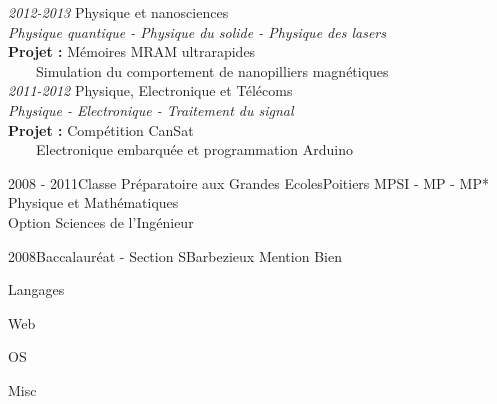 \documentclass[a4paper]{genard-cv}
\begin{document}
\begin{body}
\begin{entry}
			\textit{2012-2013} Physique et nanosciences\\
			\textit{Physique quantique - Physique du solide - Physique des lasers}\\
			\textbf{Projet :} Mémoires MRAM ultrarapides\\
			~~~~Simulation du comportement de nanopilliers magnétiques
			\medskip\\

			\textit{2011-2012} Physique, Electronique et Télécoms\\
			\textit{Physique - Electronique - Traitement du signal}\\
			\textbf{Projet :} Compétition CanSat\\
			~~~~Electronique embarquée et programmation Arduino
		\end{entry}
		\begin{entry}
			{2008 - 2011}{Classe Préparatoire aux Grandes Ecoles}{Poitiers}
			{MPSI - MP - MP*}
			Physique et Mathématiques\\
			Option Sciences de l'Ingénieur
		\end{entry}
		\begin{entry}
			{2008}{Baccalauréat - Section S}{Barbezieux}
			{Mention Bien}
		\end{entry}

\end{body}

\begin{aside}

	\begin{about}
	\end{about}\noindent

	\skills
	
	\begin{skillgroup}{Langages}
	\end{skillgroup}

	\begin{skillgroup}{Web}
	\end{skillgroup}

	\begin{skillgroup}{OS}
	\end{skillgroup}

	\begin{skillgroup}{Misc}
	\end{skillgroup}

	\skillscaption
\end{aside}
\end{document}

